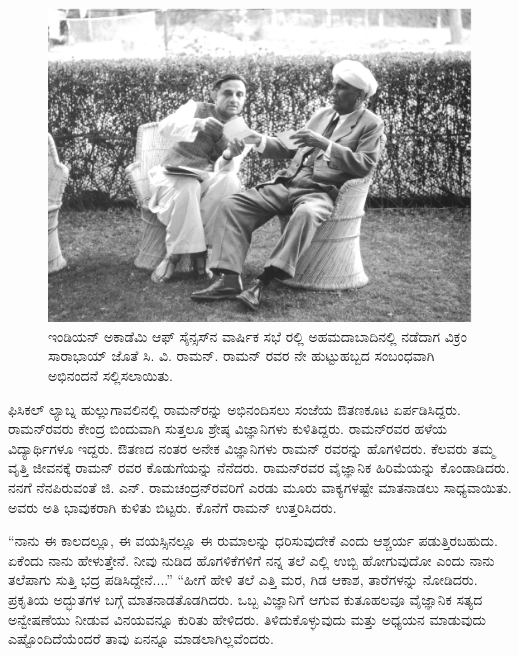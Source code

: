 \begin{figure}[!htbp]
\includegraphics[scale=0.32]{"images/11.jpg"}
\caption{ಇಂಡಿಯನ್ ಅಕಾಡೆಮಿ ಆಫ್ ಸೈನ್ಸಸ್‍ನ ವಾರ್ಷಿಕ ಸಭೆ ರಲ್ಲಿ ಅಹಮದಾಬಾದಿನಲ್ಲಿ ನಡೆದಾಗ ವಿಕ್ರಂ ಸಾರಾಭಾಯ್ ಜೊತೆ ಸಿ. ವಿ. ರಾಮನ್. ರಾಮನ್ ರವರ ನೇ ಹುಟ್ಟುಹಬ್ಬದ ಸಂಬಂಧವಾಗಿ ಅಭಿನಂದನೆ ಸಲ್ಲಿಸಲಾಯಿತು.}\label{chap2-fig02}
\end{figure}

ಫಿಸಿಕಲ್ ಲ್ಯಾಬ್ನ ಹುಲ್ಲುಗಾವಲಿನಲ್ಲಿ ರಾಮನ್‍ರನ್ನು ಅಭಿನಂದಿಸಲು ಸಂಜೆಯ ಔತಣಕೂಟ ಏರ್ಪಡಿಸಿದ್ದರು. ರಾಮನ್‍ರವರು ಕೇಂದ್ರ ಬಿಂದುವಾಗಿ ಸುತ್ತಲೂ ಶ್ರೇಷ್ಠ ವಿಜ್ಞಾನಿಗಳು ಕುಳಿತಿದ್ದರು. ರಾಮನ್‍ರವರ ಹಳೆಯ ವಿದ್ಯಾರ್ಥಿಗಳೂ ಇದ್ದರು. ಔತಣದ ನಂತರ ಅನೇಕ ವಿಜ್ಞಾನಿಗಳು ರಾಮನ್ ರವರನ್ನು ಹೊಗಳಿದರು. ಕೆಲವರು ತಮ್ಮ ವೃತ್ತಿ ಜೀವನಕ್ಕೆ ರಾಮನ್ ರವರ ಕೊಡುಗೆಯನ್ನು ನೆನೆದರು. ರಾಮನ್‍ರವರ ವೈಜ್ಞಾನಿಕ ಹಿರಿಮೆಯನ್ನು ಕೊಂಡಾಡಿದರು. ನನಗೆ ನೆನಪಿರುವಂತೆ ಜಿ. ಎನ್. ರಾಮಚಂದ್ರನ್‍ರವರಿಗೆ ಎರಡು ಮೂರು ವಾಕ್ಯಗಳಷ್ಟೇ ಮಾತನಾಡಲು ಸಾಧ್ಯವಾಯಿತು. ಅವರು ಅತಿ ಭಾವುಕರಾಗಿ ಕುಳಿತು ಬಿಟ್ಟರು. ಕೊನೆಗೆ ರಾಮನ್ ಉತ್ತರಿಸಿದರು.

 \enginline{-}“ನಾನು ಈ ಕಾಲದಲ್ಲೂ, ಈ ವಯಸ್ಸಿನಲ್ಲೂ ಈ ರುಮಾಲನ್ನು ಧರಿಸುವುದೇಕೆ ಎಂದು ಆಶ್ಚರ್ಯ ಪಡುತ್ತಿರಬಹುದು. ಏಕೆಂದು ನಾನು ಹೇಳುತ್ತೇನೆ. ನೀವು ನುಡಿದ ಹೊಗಳಿಕೆಗಳಿಗೆ ನನ್ನ ತಲೆ ಎಲ್ಲಿ ಉಬ್ಬಿ ಹೋಗುವುದೋ ಎಂದು ನಾನು ತಲೆಪಾಗು ಸುತ್ತಿ ಭದ್ರ ಪಡಿಸಿದ್ದೇನೆ....” “ಹೀಗೆ ಹೇಳಿ ತಲೆ ಎತ್ತಿ ಮರ, ಗಿಡ ಆಕಾಶ, ತಾರೆಗಳನ್ನು ನೋಡಿದರು. ಪ್ರಕೃತಿಯ ಅದ್ಭುತಗಳ ಬಗ್ಗೆ ಮಾತನಾಡತೊಡಗಿದರು. ಒಬ್ಬ ವಿಜ್ಞಾನಿಗೆ ಆಗುವ ಕುತೂಹಲವೂ ವೈಜ್ಞಾನಿಕ ಸತ್ಯದ ಅನ್ವೇಷಣೆಯು ನೀಡುವ ವಿನಯವನ್ನೂ ಕುರಿತು ಹೇಳಿದರು. ತಿಳಿದುಕೊಳ್ಳುವುದು ಮತ್ತು ಅಧ್ಯಯನ ಮಾಡುವುದು ಎಷ್ಟೊಂದಿದೆಯೆಂದರೆ ತಾವು ಏನನ್ನೂ ಮಾಡಲಾಗಿಲ್ಲವೆಂದರು.

